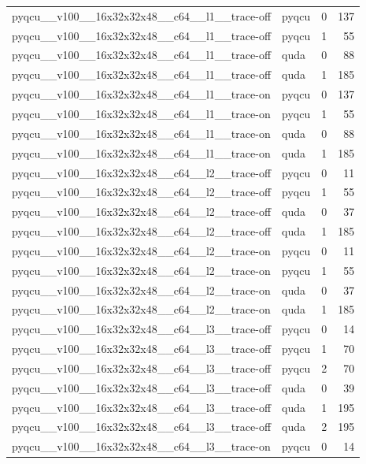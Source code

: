 \begin{table}[htbp]
\begin{tabular}{@{}llrr@{}}
pyqcu\_\_v100\_\_16x32x32x48\_\_c64\_\_l1\_\_trace-off & pyqcu & 0 & 137 \\
pyqcu\_\_v100\_\_16x32x32x48\_\_c64\_\_l1\_\_trace-off & pyqcu & 1 & 55 \\
pyqcu\_\_v100\_\_16x32x32x48\_\_c64\_\_l1\_\_trace-off & quda & 0 & 88 \\
pyqcu\_\_v100\_\_16x32x32x48\_\_c64\_\_l1\_\_trace-off & quda & 1 & 185 \\
pyqcu\_\_v100\_\_16x32x32x48\_\_c64\_\_l1\_\_trace-on & pyqcu & 0 & 137 \\
pyqcu\_\_v100\_\_16x32x32x48\_\_c64\_\_l1\_\_trace-on & pyqcu & 1 & 55 \\
pyqcu\_\_v100\_\_16x32x32x48\_\_c64\_\_l1\_\_trace-on & quda & 0 & 88 \\
pyqcu\_\_v100\_\_16x32x32x48\_\_c64\_\_l1\_\_trace-on & quda & 1 & 185 \\
pyqcu\_\_v100\_\_16x32x32x48\_\_c64\_\_l2\_\_trace-off & pyqcu & 0 & 11 \\
pyqcu\_\_v100\_\_16x32x32x48\_\_c64\_\_l2\_\_trace-off & pyqcu & 1 & 55 \\
pyqcu\_\_v100\_\_16x32x32x48\_\_c64\_\_l2\_\_trace-off & quda & 0 & 37 \\
pyqcu\_\_v100\_\_16x32x32x48\_\_c64\_\_l2\_\_trace-off & quda & 1 & 185 \\
pyqcu\_\_v100\_\_16x32x32x48\_\_c64\_\_l2\_\_trace-on & pyqcu & 0 & 11 \\
pyqcu\_\_v100\_\_16x32x32x48\_\_c64\_\_l2\_\_trace-on & pyqcu & 1 & 55 \\
pyqcu\_\_v100\_\_16x32x32x48\_\_c64\_\_l2\_\_trace-on & quda & 0 & 37 \\
pyqcu\_\_v100\_\_16x32x32x48\_\_c64\_\_l2\_\_trace-on & quda & 1 & 185 \\
pyqcu\_\_v100\_\_16x32x32x48\_\_c64\_\_l3\_\_trace-off & pyqcu & 0 & 14 \\
pyqcu\_\_v100\_\_16x32x32x48\_\_c64\_\_l3\_\_trace-off & pyqcu & 1 & 70 \\
pyqcu\_\_v100\_\_16x32x32x48\_\_c64\_\_l3\_\_trace-off & pyqcu & 2 & 70 \\
pyqcu\_\_v100\_\_16x32x32x48\_\_c64\_\_l3\_\_trace-off & quda & 0 & 39 \\
pyqcu\_\_v100\_\_16x32x32x48\_\_c64\_\_l3\_\_trace-off & quda & 1 & 195 \\
pyqcu\_\_v100\_\_16x32x32x48\_\_c64\_\_l3\_\_trace-off & quda & 2 & 195 \\
pyqcu\_\_v100\_\_16x32x32x48\_\_c64\_\_l3\_\_trace-on & pyqcu & 0 & 14 \\

\end{tabular}
\end{table}
